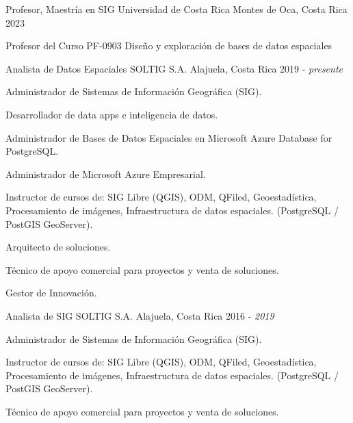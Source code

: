 

\begin{cventries}

  \cventry
    {Profesor, Maestría en SIG} %
    {Universidad de Costa Rica} %
    {Montes de Oca, Costa Rica} %
    {2023} %
    {
      \begin{cvitems} %
        \item Profesor del Curso PF-0903 Diseño y exploración de bases de datos
        espaciales
      \end{cvitems}
    }
  \cventry
    {Analista de Datos Espaciales} %
    {SOLTIG S.A.} %
    {Alajuela, Costa Rica} %
    {2019 - \textit{presente}} %
    {
      \begin{cvitems} %
        \item Administrador de Sistemas de Información Geográfica (SIG).
        \item Desarrollador de data apps e inteligencia de datos.
        \item Administrador de Bases de Datos Espaciales en Microsoft Azure
        Database for PostgreSQL.
        \item Administrador de Microsoft Azure Empresarial.
        \item Instructor de cursos de: SIG Libre (QGIS), ODM, QFiled, Geoestadística,
        Procesamiento de imágenes, Infraestructura de datos espaciales.
        (PostgreSQL / PostGIS GeoServer).
        \item Arquitecto de soluciones.
        \item Técnico de apoyo comercial para proyectos y venta de
        soluciones.
        \item Gestor de Innovación.
      \end{cvitems}
    }
  \cventry
    {Analista de SIG} %
    {SOLTIG S.A.} %
    {Alajuela, Costa Rica} %
    {2016 - \textit{2019}} %
    {
      \begin{cvitems} %
        \item Administrador de Sistemas de Información Geográfica (SIG).
        \item Instructor de cursos de: SIG Libre (QGIS), ODM, QFiled, Geoestadística,
        Procesamiento de imágenes, Infraestructura de datos espaciales.
        (PostgreSQL / PostGIS GeoServer).
        \item Técnico de apoyo comercial para proyectos y venta de
        soluciones.
      \end{cvitems}
    }
\end{cventries}
\newpage